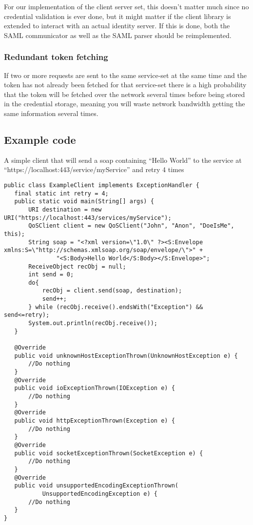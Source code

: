     For our implementation of the client server set, this doesn’t matter much since no credential validation is ever done, but it might matter if the client library is extended to interact with an actual identity server. If this is done, both the SAML communicator as well as the SAML parser should be reimplemented.

    \subsubsection{Redundant token fetching}
    
    If two or more requests are sent to the same service-set at the same time and the token has not already been fetched for that service-set there is a high probability that the token will be fetched over the network several times before being stored in the credential storage, meaning you will waste network bandwidth getting the same information several times.

    \subsection{Example code}\label{userguideExample}

    A simple client that will send a soap containing “Hello World” to the service at “https://localhost:443/service/myService” and retry 4 times

\lstset{language=java, style=eclipse}
\lstset{frame=single}
\lstset{breaklines=true}
\begin{lstlisting}[caption={A simple example client}, label=userguideExampleclient]
public class ExampleClient implements ExceptionHandler {
   final static int retry = 4;
   public static void main(String[] args) {
       URI destination = new URI("https://localhost:443/services/myService");
       QoSClient client = new QoSClient("John", "Anon", "DoeIsMe", this);
       String soap = "<?xml version=\"1.0\" ?><S:Envelope xmlns:S=\"http://schemas.xmlsoap.org/soap/envelope/\">" +
               "<S:Body>Hello World</S:Body></S:Envelope>";
       ReceiveObject recObj = null;
       int send = 0;
       do{
           recObj = client.send(soap, destination);
           send++;
       } while (recObj.receive().endsWith("Exception") && send<=retry);
       System.out.println(recObj.receive());
   }

   @Override
   public void unknownHostExceptionThrown(UnknownHostException e) {
       //Do nothing
   }
   @Override
   public void ioExceptionThrown(IOException e) {
       //Do nothing
   }
   @Override
   public void httpExceptionThrown(Exception e) {
       //Do nothing    
   }
   @Override
   public void socketExceptionThrown(SocketException e) {
       //Do nothing    
   }
   @Override
   public void unsupportedEncodingExceptionThrown(
           UnsupportedEncodingException e) {
       //Do nothing    
   }
}
\end{lstlisting}
